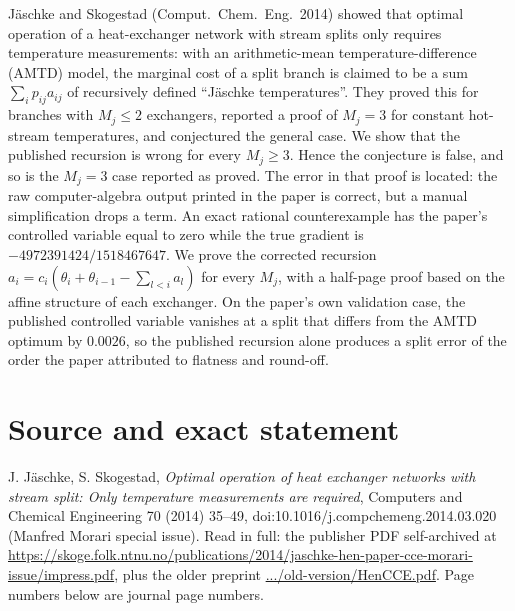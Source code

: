 \documentclass[11pt,a4paper]{report}
\begin{document}
\makepapertitle

\begin{paperabstract}
Jäschke and Skogestad (Comput.\ Chem.\ Eng.\ 2014) showed that optimal operation of a heat-exchanger network with
stream splits only requires temperature measurements: with an arithmetic-mean temperature-difference (AMTD) model, the
marginal cost of a split branch is claimed to be a sum \(\sum_i p_{ij}a_{ij}\) of recursively defined ``Jäschke
temperatures''. They proved this for branches with \(M_j\le2\) exchangers, reported a proof of \(M_j=3\) for constant
hot-stream temperatures, and conjectured the general case. We show that the published recursion is wrong for every
\(M_j\ge3\). Hence the conjecture is false, and so is the \(M_j=3\) case reported as proved. The error in that proof is
located: the raw computer-algebra output printed in the paper is correct, but a manual simplification drops a term. An
exact rational counterexample has the paper's controlled variable equal to zero while the true gradient is
\(-4972391424/1518467647\). We prove the corrected recursion \(a_i=c_i(\theta_i+\theta_{i-1}-\sum_{l<i}a_l)\) for every
\(M_j\), with a half-page proof based on the affine structure of each exchanger. On the paper's own validation case, the
published controlled variable vanishes at a split that differs from the AMTD optimum by \(0.0026\), so the published
recursion alone produces a split error of the order the paper attributed to flatness and round-off.
\end{paperabstract}

\section{Source and exact statement}

J. Jäschke, S. Skogestad, \emph{Optimal operation of heat exchanger networks with stream split: Only temperature
measurements are required}, Computers and Chemical Engineering 70 (2014) 35--49,
doi:10.1016/j.compchemeng.2014.03.020~\autocite{JS14} (Manfred Morari special issue). Read in full: the publisher PDF
self-archived at
\url{https://skoge.folk.ntnu.no/publications/2014/jaschke-hen-paper-cce-morari-issue/impress.pdf}, plus the older
preprint \url{.../old-version/HenCCE.pdf}. Page numbers below are journal page numbers.
\end{document}
